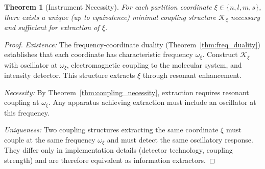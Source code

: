 \documentclass[twocolumn,10pt,a4paper]{article}
\newtheorem{theorem}{Theorem}[section]
\theoremstyle{definition}
\theoremstyle{remark}
\newcommand{\coupling}{\mathcal{K}}
\begin{document}
\begin{theorem}[Instrument Necessity]
\label{thm:instrument_necessity}
For each partition coordinate $\xi \in \{n, l, m, s\}$, there exists a unique (up to equivalence) minimal coupling structure $\coupling_\xi$ necessary and sufficient for extraction of $\xi$.
\end{theorem}

\begin{proof}
\textit{Existence:} The frequency-coordinate duality (Theorem~\ref{thm:freq_duality}) establishes that each coordinate has characteristic frequency $\omega_\xi$. Construct $\coupling_\xi$ with oscillator at $\omega_\xi$, electromagnetic coupling to the molecular system, and intensity detector. This structure extracts $\xi$ through resonant enhancement.

\textit{Necessity:} By Theorem~\ref{thm:coupling_necessity}, extraction requires resonant coupling at $\omega_\xi$. Any apparatus achieving extraction must include an oscillator at this frequency.

\textit{Uniqueness:} Two coupling structures extracting the same coordinate $\xi$ must couple at the same frequency $\omega_\xi$ and must detect the same oscillatory response. They differ only in implementation details (detector technology, coupling strength) and are therefore equivalent as information extractors.
\end{proof}
\end{document}

